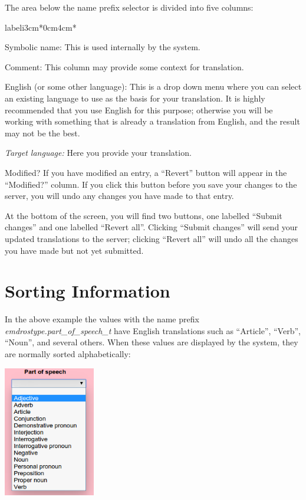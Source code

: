 \documentclass[11pt,oneside,a4paper]{memoir}
\begin{document}
The area below the name prefix selector is divided into five columns:


\begin{flexlabelled}{labeli}{3cm}{*}{0cm}{4cm}{*}
\item[Symbolic name:\hfill] This is used internally by the system.
\item[Comment:] This column may provide some context for translation.
\item[English (or some other language):] This is a drop down menu where you can select an existing
  language to use as the basis for your translation. It is highly recommended that you use English
  for this purpose; otherwise you will be working with something that is already a translation
  from English, and the result may not be the best.
\item[\emph{Target language:}\hfill]  Here you provide your translation.
\item[Modified?] If you have modified an entry, a ``Revert'' button will appear in the ``Modified?''
  column. If you click this button before you save your changes to the server, you will undo any
  changes you have made to that entry.
\end{flexlabelled}

At the bottom of the screen, you will find two buttons, one labelled ``Submit changes'' and one
labelled ``Revert all''. Clicking ``Submit changes'' will send your updated translations to the server;
clicking ``Revert all'' will undo all the changes you have made but not yet submitted.


\section{Sorting Information}

In the above example the values with the name prefix \emph{emdrostype.part\_of\_speech\_t} have
English translations such as ``Article'', ``Verb'', ``Noun'', and several others. When these values
are displayed by the system, they are normally sorted alphabetically:

\begin{center}
  \includegraphics[width=0.3\textwidth]{psp.png}
\end{center}
\end{document}
